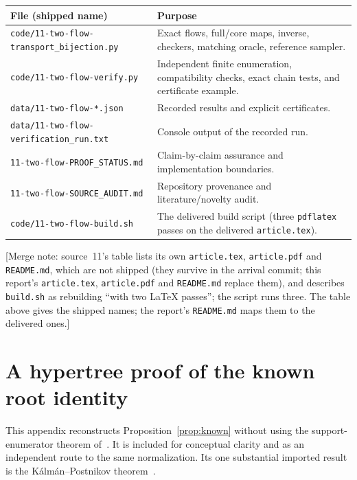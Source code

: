 \documentclass[11pt]{article}
\numberwithin{equation}{section}
\theoremstyle{definition}
\begin{document}
\begin{center}\small
\begin{tabularx}{\textwidth}{@{}p{}Y@{}}\toprule
File (shipped name) & Purpose\\\midrule
\nolinkurl{code/11-two-flow-transport_bijection.py} & Exact flows, full/core maps,
inverse, checkers, matching oracle, reference sampler.\\
\nolinkurl{code/11-two-flow-verify.py} & Independent finite enumeration, compatibility
checks, exact chain tests, and certificate example.\\
\nolinkurl{data/11-two-flow-*.json} & Recorded results and explicit certificates.\\
\nolinkurl{data/11-two-flow-verification_run.txt} & Console output of the recorded run.\\
\nolinkurl{11-two-flow-PROOF_STATUS.md} & Claim-by-claim assurance and implementation boundaries.\\
\nolinkurl{11-two-flow-SOURCE_AUDIT.md} & Repository provenance and literature/novelty audit.\\
\nolinkurl{code/11-two-flow-build.sh} & The delivered build script (three
\texttt{pdflatex} passes on the delivered \texttt{article.tex}).\\\bottomrule
\end{tabularx}
\end{center}
[Merge note: source~11's table lists its own \texttt{article.tex},
\texttt{article.pdf} and \texttt{README.md}, which are not shipped (they
survive in the arrival commit; this report's \texttt{article.tex},
\texttt{article.pdf} and \texttt{README.md} replace them), and describes
\texttt{build.sh} as rebuilding ``with two LaTeX passes''; the script runs
three. The table above gives the shipped names; the report's
\texttt{README.md} maps them to the delivered ones.]

\appendix
{}
\section{A hypertree proof of the known root identity}\label{app:hypertrees}

This appendix reconstructs Proposition~\ref{prop:known} without using the
support-enumerator theorem of~\cite{DHLTW}. It is included for conceptual
clarity and as an independent route to the same normalization. Its one
substantial imported result is the K\'alm\'an--Postnikov theorem~\cite{KP}.
\end{document}
